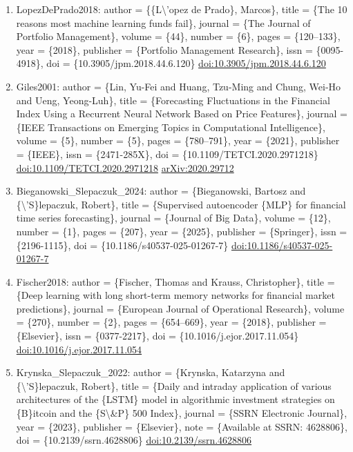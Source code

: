 \documentclass[11pt]{article}
\begin{document}
\begin{enumerate}[leftmargin=*]
  \item LopezDePrado2018: author = \{\{L\textbackslash{}'opez de Prado\}, Marcos\}, title = \{The 10 reasons most machine learning funds fail\}, journal = \{The Journal of Portfolio Management\}, volume = \{44\}, number = \{6\}, pages = \{120--133\}, year = \{2018\}, publisher = \{Portfolio Management Research\}, issn = \{0095-4918\}, doi = \{10.3905/jpm.2018.44.6.120\} \href{https://doi.org/10.3905/jpm.2018.44.6.120}{doi:10.3905/jpm.2018.44.6.120}
  \item Giles2001: author = \{Lin, Yu-Fei and Huang, Tzu-Ming and Chung, Wei-Ho and Ueng, Yeong-Luh\}, title = \{Forecasting Fluctuations in the Financial Index Using a Recurrent Neural Network Based on Price Features\}, journal = \{IEEE Transactions on Emerging Topics in Computational Intelligence\}, volume = \{5\}, number = \{5\}, pages = \{780--791\}, year = \{2021\}, publisher = \{IEEE\}, issn = \{2471-285X\}, doi = \{10.1109/TETCI.2020.2971218\} \href{https://doi.org/10.1109/TETCI.2020.2971218}{doi:10.1109/TETCI.2020.2971218} \href{https://arxiv.org/abs/2020.29712}{arXiv:2020.29712}
  \item Bieganowski\_Slepaczuk\_2024: author = \{Bieganowski, Bartosz and \{\textbackslash{}'S\}lepaczuk, Robert\}, title = \{Supervised autoencoder \{MLP\} for financial time series forecasting\}, journal = \{Journal of Big Data\}, volume = \{12\}, number = \{1\}, pages = \{207\}, year = \{2025\}, publisher = \{Springer\}, issn = \{2196-1115\}, doi = \{10.1186/s40537-025-01267-7\} \href{https://doi.org/10.1186/s40537-025-01267-7}{doi:10.1186/s40537-025-01267-7}
  \item Fischer2018: author = \{Fischer, Thomas and Krauss, Christopher\}, title = \{Deep learning with long short-term memory networks for financial market predictions\}, journal = \{European Journal of Operational Research\}, volume = \{270\}, number = \{2\}, pages = \{654--669\}, year = \{2018\}, publisher = \{Elsevier\}, issn = \{0377-2217\}, doi = \{10.1016/j.ejor.2017.11.054\} \href{https://doi.org/10.1016/j.ejor.2017.11.054}{doi:10.1016/j.ejor.2017.11.054}
  \item Krynska\_Slepaczuk\_2022: author = \{Krynska, Katarzyna and \{\textbackslash{}'S\}lepaczuk, Robert\}, title = \{Daily and intraday application of various architectures of the \{LSTM\} model in algorithmic investment strategies on \{B\}itcoin and the \{S\textbackslash{}\&P\} 500 Index\}, journal = \{SSRN Electronic Journal\}, year = \{2023\}, publisher = \{Elsevier\}, note = \{Available at SSRN: 4628806\}, doi = \{10.2139/ssrn.4628806\} \href{https://doi.org/10.2139/ssrn.4628806}{doi:10.2139/ssrn.4628806}

\end{enumerate}
\end{document}
